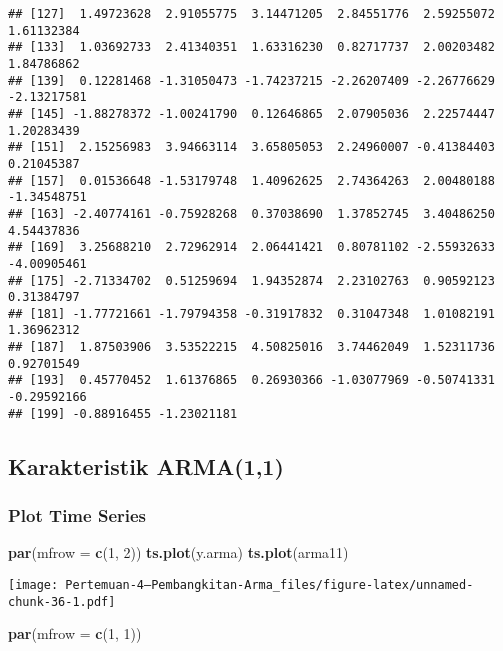 \documentclass[
]{article}
\newenvironment{Shaded}{\begin{snugshade}}{\end{snugshade}}
\newcommand{\AttributeTok}[1]{\textcolor[rgb]{0.13,0.29,0.53}{#1}}
\newcommand{\DecValTok}[1]{\textcolor[rgb]{0.00,0.00,0.81}{#1}}
\newcommand{\FunctionTok}[1]{\textcolor[rgb]{0.13,0.29,0.53}{\textbf{#1}}}
\newcommand{\NormalTok}[1]{#1}
\begin{document}
\begin{verbatim}
## [127]  1.49723628  2.91055775  3.14471205  2.84551776  2.59255072  1.61132384
## [133]  1.03692733  2.41340351  1.63316230  0.82717737  2.00203482  1.84786862
## [139]  0.12281468 -1.31050473 -1.74237215 -2.26207409 -2.26776629 -2.13217581
## [145] -1.88278372 -1.00241790  0.12646865  2.07905036  2.22574447  1.20283439
## [151]  2.15256983  3.94663114  3.65805053  2.24960007 -0.41384403  0.21045387
## [157]  0.01536648 -1.53179748  1.40962625  2.74364263  2.00480188 -1.34548751
## [163] -2.40774161 -0.75928268  0.37038690  1.37852745  3.40486250  4.54437836
## [169]  3.25688210  2.72962914  2.06441421  0.80781102 -2.55932633 -4.00905461
## [175] -2.71334702  0.51259694  1.94352874  2.23102763  0.90592123  0.31384797
## [181] -1.77721661 -1.79794358 -0.31917832  0.31047348  1.01082191  1.36962312
## [187]  1.87503906  3.53522215  4.50825016  3.74462049  1.52311736  0.92701549
## [193]  0.45770452  1.61376865  0.26930366 -1.03077969 -0.50741331 -0.29592166
## [199] -0.88916455 -1.23021181
\end{verbatim}

\subsection{Karakteristik ARMA(1,1)}\label{karakteristik-arma11}

\subsubsection{Plot Time Series}\label{plot-time-series-2}

\begin{Shaded}
\begin{Highlighting}[]
\FunctionTok{par}\NormalTok{(}\AttributeTok{mfrow =} \FunctionTok{c}\NormalTok{(}\DecValTok{1}\NormalTok{, }\DecValTok{2}\NormalTok{))}
\FunctionTok{ts.plot}\NormalTok{(y.arma)}
\FunctionTok{ts.plot}\NormalTok{(arma11)}
\end{Highlighting}
\end{Shaded}

\texttt{[image: Pertemuan-4---Pembangkitan-Arma\_files/figure-latex/unnamed-chunk-36-1.pdf]}

\begin{Shaded}
\begin{Highlighting}[]
\FunctionTok{par}\NormalTok{(}\AttributeTok{mfrow =} \FunctionTok{c}\NormalTok{(}\DecValTok{1}\NormalTok{, }\DecValTok{1}\NormalTok{))}
\end{Highlighting}
\end{Shaded}
\end{document}
